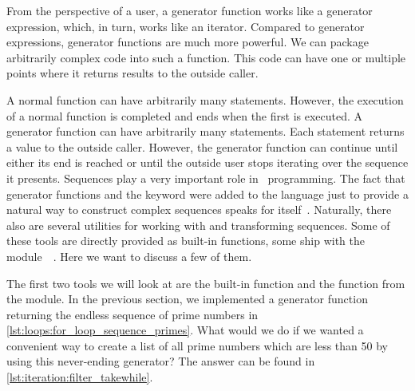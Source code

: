 From the perspective of a user, a generator function works like a generator expression, which, in turn, works like an iterator.
Compared to generator expressions, generator functions are much more powerful.
We can package arbitrarily complex code into such a function.
This code can have one or multiple points where it returns results to the outside caller.

A normal function can have arbitrarily many  statements.
However, the execution of a normal function is completed and ends when the first  is executed.
A generator function can have arbitrarily many  statements.
Each statement returns a value to the outside caller.
However, the generator function can continue until either its end is reached or until the outside user stops iterating over the sequence it presents.%
\FloatBarrier%
\endhsection%
%
%
\label{sec:operationsOnIterators}%
%
%
%
%
Sequences play a very important role in \python\ programming.
The fact that generator functions and the  keyword were added to the language just to provide a natural way to construct complex sequences speaks for itself~\cite{PEP255}.
Naturally, there also are several utilities for working with and transforming sequences.
Some of these tools are directly provided as built-in functions, some ship with the module~~\cite{PSF:P3D:TPSL:IFCIFEL}.
Here we want to discuss a few of them.

The first two tools we will look at are the built-in function  and the  function from the  module.
In the previous section, we implemented a generator function returning the endless sequence of prime numbers in \cref{lst:loops:for_loop_sequence_primes}.
What would we do if we wanted a convenient way to create a list of all prime numbers which are less than 50 by using this never-ending generator?
The answer can be found in \cref{lst:iteration:filter_takewhile}.

